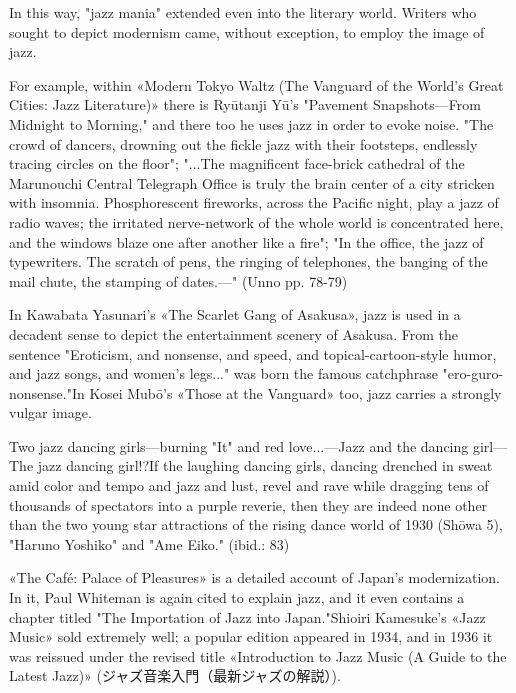 In this way, "jazz mania" extended even into the literary world. Writers who sought to depict modernism came, without exception, to employ the image of jazz.

For example, within «Modern Tokyo Waltz (The Vanguard of the World's Great Cities: Jazz Literature)» there is Ryūtanji Yū's "Pavement Snapshots—From Midnight to Morning," and there too he uses jazz in order to evoke noise. "The crowd of dancers, drowning out the fickle jazz with their footsteps, endlessly tracing circles on the floor"; "...The magnificent face-brick cathedral of the Marunouchi Central Telegraph Office is truly the brain center of a city stricken with insomnia. Phosphorescent fireworks, across the Pacific night, play a jazz of radio waves; the irritated nerve-network of the whole world is concentrated here, and the windows blaze one after another like a fire"; "In the office, the jazz of typewriters. The scratch of pens, the ringing of telephones, the banging of the mail chute, the stamping of dates.—" (Unno pp. 78-79)

In Kawabata Yasunari's «The Scarlet Gang of Asakusa», jazz is used in a decadent sense to depict the entertainment scenery of Asakusa. From the sentence "Eroticism, and nonsense, and speed, and topical-cartoon-style humor, and jazz songs, and women's legs..." was born the famous catchphrase "ero-guro-nonsense."In Kosei Mubō's «Those at the Vanguard» too, jazz carries a strongly vulgar image.

\begin{gquote}
Two jazz dancing girls—burning "It" and red love...—Jazz and the dancing girl— The jazz dancing girl!?If the laughing dancing girls, dancing drenched in sweat amid color and tempo and jazz and lust, revel and rave while dragging tens of thousands of spectators into a purple reverie, then they are indeed none other than the two young star attractions of the rising dance world of 1930 (Shōwa 5), "Haruno Yoshiko" and "Ame Eiko." (ibid.: 83)
\end{gquote}

«The Café: Palace of Pleasures» is a detailed account of Japan's modernization. In it, Paul Whiteman is again cited to explain jazz, and it even contains a chapter titled "The Importation of Jazz into Japan."Shioiri Kamesuke's «Jazz Music» sold extremely well; a popular edition appeared in 1934, and in 1936 it was reissued under the revised title «Introduction to Jazz Music (A Guide to the Latest Jazz)» (ジャズ音楽入門（最新ジャズの解説）).

